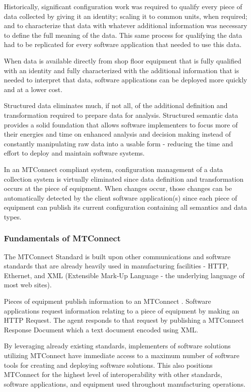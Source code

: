 Historically, significant configuration work was required to qualify every piece of data collected by giving it an identity; scaling it to common units, when required; and to characterize that data with whatever additional information was necessary to define the full meaning of the data.   This same process for qualifying the data had to be replicated for every software application that needed to use this data.    

When data is available directly from shop floor equipment that is fully qualified with an identity and fully characterized with the additional information that is needed to interpret that data, software applications can be deployed more quickly and at a lower cost.    

Structured data eliminates much, if not all, of the additional definition and transformation required to prepare data for analysis.   Structured semantic data provides a solid foundation that allows software implementers to focus more of their energies and time on enhanced analysis and decision making instead of constantly manipulating raw data into a usable form - reducing the time and effort to deploy and maintain software systems.  
 
In an MTConnect compliant system, configuration management of a data collection system is virtually eliminated since data definition and transformation occurs at the piece of equipment.   When changes occur, those changes can be automatically detected by the client software application(s) since each piece of equipment can publish its current configuration containing all semantics and data types.

\subsubsection{Fundamentals of MTConnect}

The MTConnect Standard is built upon other communications and software standards that are already heavily used in manufacturing facilities - HTTP, Ethernet, and XML (Extensible Mark-Up Language - the underlying language of most web sites).
 
Pieces of equipment publish information to an MTConnect .  Software applications request information relating to a piece of equipment by making an HTTP Request. The agent responds to that request by publishing a MTConnect Response Document which a text document encoded using XML.   
 
By leveraging already existing standards, implementers of software solutions utilizing MTConnect have immediate access to a maximum number of software tools for creating and deploying software solutions.   This also positions MTConnect for the highest level of interoperability with other standards, software applications, and equipment used throughout manufacturing operations.    
 
